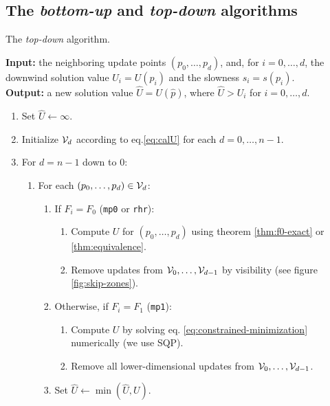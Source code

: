 \documentclass[smallcondensed]{svjour3}
\begin{document}
\subsection{The \emph{bottom-up} and \emph{top-down} algorithms}\label{ssec:top-down-and-bottom-up}

\begin{algorithm}[t]
  \caption{The \emph{top-down} algorithm.}\label{alg:top-down}
  \textbf{Input:} the neighboring update points $(p_0, \hdots, p_d)$,
  and, for $i = 0, \hdots, d$, the downwind solution value
  $U_i = U(p_i)$ and the slowness $s_i = s(p_i)$. \\
  \textbf{Output:} a new solution value $\hat{U} = U(\hat{p})$, where
  $\hat{U} > U_i$ for $i = 0, \hdots, d$.
  \begin{enumerate}[nolistsep]
  \item Set $\hat{U} \gets \infty$.
  \item Initialize $\mathcal{V}_d$ according to eq.\@ \ref{eq:calU} for
    each $d = 0, \hdots, n - 1$.
  \item For $d = n - 1$ down to $0$:
    \begin{enumerate}
    \item For each $(p_0, \hdots, p_d) \in \mathcal{V}_d$:
      \begin{enumerate}
      \item If $F_i = F_0$ (\texttt{mp0} or \texttt{rhr}):
        \begin{enumerate}
        \item Compute $U$ for $(p_0, \hdots, p_{d})$ using theorem
          \ref{thm:f0-exact} or \ref{thm:equivalence}.
        \item Remove updates from $\mathcal{V}_0, \hdots, \mathcal{V}_{d-1}$ by
          visibility (see figure \ref{fig:skip-zones}).
        \end{enumerate}
      \item Otherwise, if $F_i = F_1$ (\texttt{mp1}):
        \begin{enumerate}
        \item Compute $U$ by solving eq.\@
          \ref{eq:constrained-minimization} numerically (we use SQP).
        \item Remove all lower-dimensional updates from
          $\mathcal{V}_0, \hdots, \mathcal{V}_{d-1}$.
        \end{enumerate}
      \item Set $\hat{U} \gets \min(\hat{U}, U)$.
      \end{enumerate}
    \end{enumerate}
  \end{enumerate}
\end{algorithm}
\end{document}
